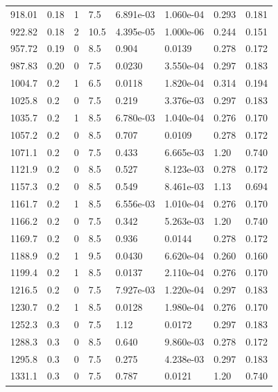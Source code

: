 \documentclass[preview]{standalone}
\begin{document}
{{{\begin{tabular}{L{1.2cm}C{1.2cm} C{0.3cm}C{0.5cm} C{1.4cm}C{1.4cm} C{1.4cm}C{1.4cm}}
  918.01  &  0.18  & 1     & 7.5 &  6.891e-03  & 1.060e-04  & 0.293 &  0.181   \\ 
  922.82  &  0.18  & 2     & 10.5 &  4.395e-05  & 1.000e-06  & 0.244 &  0.151   \\ 
  957.72  &  0.19  & 0     & 8.5 &  0.904  & 0.0139  & 0.278 &  0.172   \\ 
  987.83  &  0.20  & 0     & 7.5 &  0.0230  & 3.550e-04  & 0.297 &  0.183   \\ 
  1004.7  &   0.2  & 1     & 6.5 &  0.0118  & 1.820e-04  & 0.314 &  0.194   \\ 
  1025.8  &   0.2  & 0     & 7.5 &  0.219  & 3.376e-03  & 0.297 &  0.183   \\ 
  1035.7  &   0.2  & 1     & 8.5 &  6.780e-03  & 1.040e-04  & 0.276 &  0.170   \\ 
  1057.2  &   0.2  & 0     & 8.5 &  0.707  & 0.0109  & 0.278 &  0.172   \\ 
  1071.1  &   0.2  & 0     & 7.5 &  0.433  & 6.665e-03  & 1.20 &  0.740   \\ 
  1121.9  &   0.2  & 0     & 8.5 &  0.527  & 8.123e-03  & 0.278 &  0.172   \\ 
  1157.3  &   0.2  & 0     & 8.5 &  0.549  & 8.461e-03  & 1.13 &  0.694   \\ 
  1161.7  &   0.2  & 1     & 8.5 &  6.556e-03  & 1.010e-04  & 0.276 &  0.170   \\ 
  1166.2  &   0.2  & 0     & 7.5 &  0.342  & 5.263e-03  & 1.20 &  0.740   \\ 
  1169.7  &   0.2  & 0     & 8.5 &  0.936  & 0.0144  & 0.278 &  0.172   \\ 
  1188.9  &   0.2  & 1     & 9.5 &  0.0430  & 6.620e-04  & 0.260 &  0.160   \\ 
  1199.4  &   0.2  & 1     & 8.5 &  0.0137  & 2.110e-04  & 0.276 &  0.170   \\ 
  1216.5  &   0.2  & 0     & 7.5 &  7.927e-03  & 1.220e-04  & 0.297 &  0.183   \\ 
  1230.7  &   0.2  & 1     & 8.5 &  0.0128  & 1.980e-04  & 0.276 &  0.170   \\ 
  1252.3  &   0.3  & 0     & 7.5 &  1.12  & 0.0172  & 0.297 &  0.183   \\ 
  1288.3  &   0.3  & 0     & 8.5 &  0.640  & 9.860e-03  & 0.278 &  0.172   \\ 
  1295.8  &   0.3  & 0     & 7.5 &  0.275  & 4.238e-03  & 0.297 &  0.183   \\ 
  1331.1  &   0.3  & 0     & 7.5 &  0.787  & 0.0121  & 1.20 &  0.740   \\ 

\end{tabular}}}}
\end{document}
